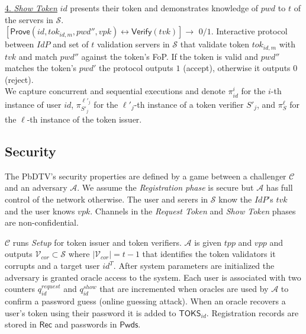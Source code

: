 \documentclass[conference]{IEEEtran}
\newcommand{\cA}{\mathcal{A}}
\newcommand{\cC}{\mathcal{C}}
\newcommand{\cV}{\mathcal{V}}
\newcommand{\pwd}{pwd}
\newcommand{\uid}{id}
\newcommand{\tvk}{tvk}
\newcommand{\tpp}{tpp}
\newcommand{\vpk}{vpk}
\newcommand{\vpp}{vpp}
\begin{document}
\underline{4. {\em Show Token}} $id$ presents their token and demonstrates knowledge of $pwd$ to $t$ of the servers in $\mathcal{S}$.\\
$[\mathsf{Prove}(\uid, tok_{\uid,m}, \pwd'', \vpk) \longleftrightarrow \mathsf{Verify}(\tvk)] \rightarrow$ $0/1$. %
Interactive protocol between $IdP$ and set of $t$ validation servers in $\mathcal{S}$ that validate token $tok_{\uid,m}$ with $\tvk$ and match $\pwd''$ against the token's FoP. If the token is valid and $pwd''$ matches the token's $pwd'$ the protocol outputs $1$ (accept), otherwise it outputs $0$ (reject).\\

We capture concurrent and sequential executions and denote $\pi^{i}_{\uid}$ for the $i$-th instance of user $\uid$, $\pi^{\ell'_j}_{S'_{j}}$ for the $\ell'_j$-th instance of a token verifier $S'_j$, and $\pi^{\ell}_{S}$ for the $\ell$-th instance of the token issuer. 

\subsection{Security}
\label{sec:security_PbTV}
The PbDTV's security properties are defined by a game between a challenger $\cC$ and an adversary $\cA$. We assume the {\em Registration phase} is secure but $\cA$ has full control of the network otherwise. The user and serers in $\mathcal{S}$ know the $IdP$'s $\tvk$ and the user knows $\vpk$. Channels in the {\em Request Token} and {\em Show Token} phases are non-confidential. 

$\cC$ runs {\em Setup} for token issuer and token verifiers. $\cA$ is given $\tpp$ and $\vpp$ and outputs $\cV_{cor} \subset \mathcal{S}$ where $|\cV_{cor}| = t-1$ that identifies the token validators it corrupts and a target user $\uid^{T}$. After system parameters are initialized the adversary is granted oracle access to the system. Each user is associated with two counters $q^{request}_{\uid}$ and $q^{show}_{\uid}$ that are incremented when oracles are used by $\cA$ to confirm a password guess (online guessing attack). When an oracle recovers a user's token using their password it is added to $\mathsf{TOKS}_{\uid}$. Registration records are stored in $\mathsf{Rec}$ and passwords in $\mathsf{Pwds}$.
\end{document}
